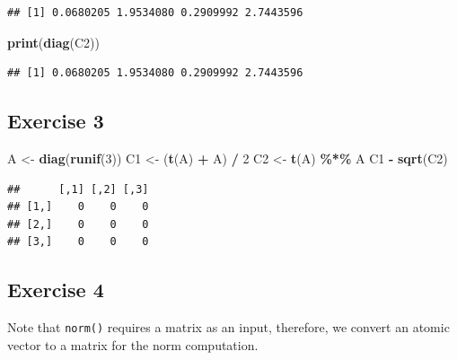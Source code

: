 \documentclass[
]{book}
\newenvironment{Shaded}{\begin{snugshade}}{\end{snugshade}}
\newcommand{\DecValTok}[1]{\textcolor[rgb]{0.00,0.00,0.81}{#1}}
\newcommand{\KeywordTok}[1]{\textcolor[rgb]{0.13,0.29,0.53}{\textbf{#1}}}
\newcommand{\NormalTok}[1]{#1}
\newcommand{\OperatorTok}[1]{\textcolor[rgb]{0.81,0.36,0.00}{\textbf{#1}}}
\newcommand{\StringTok}[1]{\textcolor[rgb]{0.31,0.60,0.02}{#1}}
\begin{document}
\begin{verbatim}
## [1] 0.0680205 1.9534080 0.2909992 2.7443596
\end{verbatim}

\begin{Shaded}
\begin{Highlighting}[]
\KeywordTok{print}\NormalTok{(}\KeywordTok{diag}\NormalTok{(C2))}
\end{Highlighting}
\end{Shaded}

\begin{verbatim}
## [1] 0.0680205 1.9534080 0.2909992 2.7443596
\end{verbatim}

\hypertarget{exercise-3-2}{%
\subsection*{Exercise 3}\label{exercise-3-2}}

\begin{Shaded}
\begin{Highlighting}[]
\NormalTok{A \textless{}{-}}\StringTok{ }\KeywordTok{diag}\NormalTok{(}\KeywordTok{runif}\NormalTok{(}\DecValTok{3}\NormalTok{))}
\NormalTok{C1 \textless{}{-}}\StringTok{ }\NormalTok{(}\KeywordTok{t}\NormalTok{(A) }\OperatorTok{+}\StringTok{ }\NormalTok{A) }\OperatorTok{/}\StringTok{ }\DecValTok{2}
\NormalTok{C2 \textless{}{-}}\StringTok{ }\KeywordTok{t}\NormalTok{(A) }\OperatorTok{\%*\%}\StringTok{ }\NormalTok{A}
\NormalTok{C1 }\OperatorTok{{-}}\StringTok{ }\KeywordTok{sqrt}\NormalTok{(C2)}
\end{Highlighting}
\end{Shaded}

\begin{verbatim}
##      [,1] [,2] [,3]
## [1,]    0    0    0
## [2,]    0    0    0
## [3,]    0    0    0
\end{verbatim}

\hypertarget{exercise-4}{%
\subsection*{Exercise 4}\label{exercise-4}}

Note that \texttt{norm()} requires a matrix as an input, therefore, we convert an atomic vector to a matrix for the norm computation.
\end{document}

